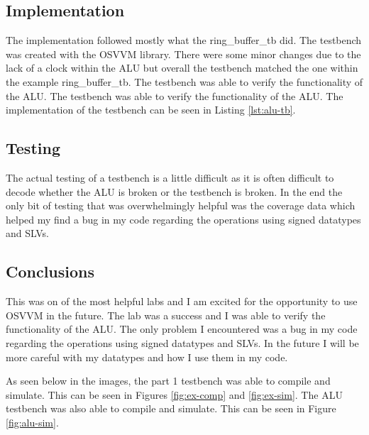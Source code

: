 \documentclass{article}
\begin{document}
\subsection*{Implementation}
The implementation followed mostly what the ring\_buffer\_tb did. The testbench was created with the OSVVM library. There were some minor changes due to the lack of a clock within the ALU but overall the testbench matched the one within the example ring\_buffer\_tb. The testbench was able to verify the functionality of the ALU. The testbench was able to verify the functionality of the ALU. The implementation of the testbench can be seen in Listing \ref{lst:alu-tb}.

\subsection*{Testing}
The actual testing of a testbench is a little difficult as it is often difficult to decode whether the ALU is broken or the testbench is broken. In the end the only bit of testing that was overwhelmingly helpful was the coverage data which helped my find a bug in my code regarding the operations using signed datatypes and SLVs.
\subsection*{Conclusions}
This was on of the most helpful labs and I am excited for the opportunity to use OSVVM in the future. The lab was a success and I was able to verify the functionality of the ALU. The only problem I encountered was a bug in my code regarding the operations using signed datatypes and SLVs. In the future I will be more careful with my datatypes and how I use them in my code. 

As seen below in the images, the part 1 testbench was able to compile and simulate. This can be seen in Figures \ref{fig:ex-comp} and \ref{fig:ex-sim}. The ALU testbench was also able to compile and simulate. This can be seen in Figure \ref{fig:alu-sim}.
\end{document}
